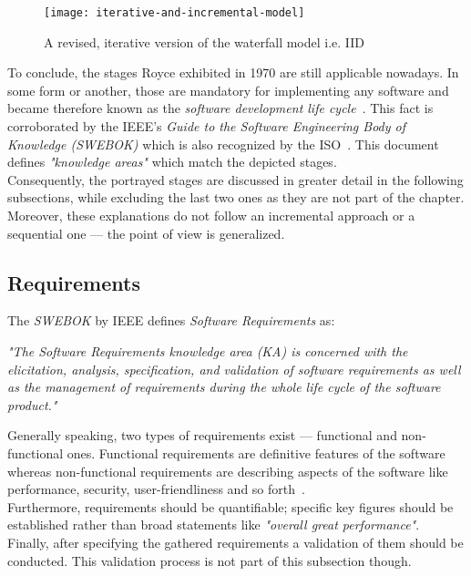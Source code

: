 \documentclass[12pt,a4paper,twoside]{report}
\begin{document}
\begin{figure}[htbp]
\centering
\texttt{[image: iterative-and-incremental-model]}
\caption{A revised, iterative version of the waterfall model i.e. IID}
\label{fig:idd-model}
\end{figure}

To conclude, the stages Royce exhibited in 1970 are still applicable nowadays.
In some form or another, those are mandatory for implementing any software
and became therefore known as the \textit{software development life cycle}~\cite{se-ieee}.
This fact is corroborated by the IEEE's
\textit{Guide to the Software Engineering Body of Knowledge (SWEBOK)}
which is also recognized by the ISO~\cite{swebok}.
This document defines \textit{"knowledge areas"} which match the depicted stages.\\
Consequently, the portrayed stages are discussed in greater detail in the following subsections,
while excluding the last two ones as they are not part of the
\textit{} chapter.
Moreover, these explanations do not follow an incremental approach
or a sequential one --- the point of view is generalized.


\subsection{Requirements} \label{subsect:requirements}

The \textit{SWEBOK} by IEEE defines \textit{Software Requirements} as:
\begin{displayquote}
\emph{"The Software Requirements knowledge area (KA) is concerned with
the elicitation, analysis, specification, and validation of software requirements
as well as the management of requirements during the whole
life cycle of the software product."}~\cite{swebok}
\end{displayquote}
Generally speaking, two types of requirements exist --- functional and non-functional ones.
Functional requirements are definitive features of the software whereas non-functional
requirements are describing aspects of the software like performance, security,
user-friendliness and so forth~\cite{sommerville-se}.\\
Furthermore, requirements should be quantifiable; specific key figures should be established
rather than broad statements like \textit{"overall great performance"}.\\
Finally, after specifying the gathered requirements a validation of them should be conducted.
This validation process is not part of this subsection though.
\end{document}
